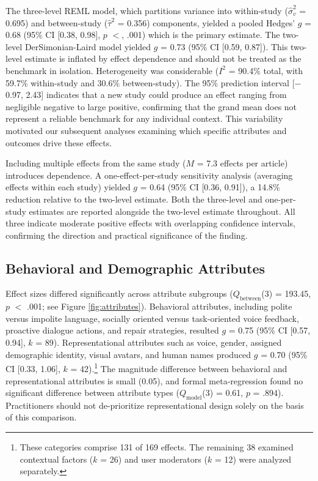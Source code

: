 \documentclass[preprint,review,12pt,authoryear,nonatbib]{elsarticle}
\begin{document}
The three-level REML model, which partitions variance into within-study ($\hat{\sigma}^2_v$ = 0.695) and between-study ($\hat{\tau}^2$ = 0.356) components, yielded a pooled Hedges' $g$ = 0.68 (95\% CI [0.38, 0.98], $p$ $<$, .001) which is the primary estimate. The two-level DerSimonian-Laird model yielded $g$ = 0.73 (95\% CI [0.59, 0.87]). This two-level estimate is inflated by effect dependence and should not be treated as the benchmark in isolation. Heterogeneity was considerable ($I^2$ = 90.4\% total, with 59.7\% within-study and 30.6\% between-study). The 95\% prediction interval [$-$0.97, 2.43] indicates that a new study could produce an effect ranging from negligible negative to large positive, confirming that the grand mean does not represent a reliable benchmark for any individual context. This variability motivated our subsequent analyses examining which specific attributes and outcomes drive these effects.

Including multiple effects from the same study ($M$ = 7.3 effects per article) introduces dependence. A one-effect-per-study sensitivity analysis (averaging effects within each study) yielded $g$ = 0.64 (95\% CI [0.36, 0.91]), a 14.8\% reduction relative to the two-level estimate. Both the three-level and one-per-study estimates are reported alongside the two-level estimate throughout. All three indicate moderate positive effects with overlapping confidence intervals, confirming the direction and practical significance of the finding.

\subsection{Behavioral and Demographic Attributes} \label{sec:beh}

Effect sizes differed significantly across attribute subgroups ($Q_{\text{between}}$(3) = 193.45, $p$ $<$ .001; see Figure \ref{fig:attributes}). Behavioral attributes, including polite versus impolite language, socially oriented versus task-oriented voice feedback, proactive dialogue actions, and repair strategies, resulted $g$ = 0.75 (95\% CI [0.57, 0.94], $k$ = 89). Representational attributes such as voice, gender, assigned demographic identity, visual avatars, and human names produced $g$ = 0.70 (95\% CI [0.33, 1.06], $k$ = 42).\footnote{These categories comprise 131 of 169 effects. The remaining 38 examined contextual factors ($k$ = 26) and user moderators ($k$ = 12) were analyzed separately.} The magnitude difference between behavioral and representational attributes is small (0.05), and formal meta-regression found no significant difference between attribute types ($Q_{\text{model}}$(3) = 0.61, $p$ = .894). Practitioners should not de-prioritize representational design solely on the basis of this comparison.
\end{document}
